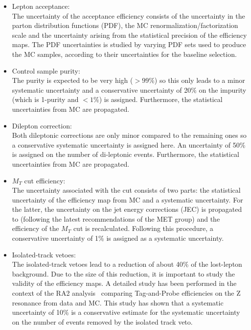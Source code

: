 \begin{itemize}
\item Lepton acceptance:\\
  The uncertainty of the acceptance efficiency consists of the uncertainty
  in the parton distribution functions (PDF), the MC renormalization/factorization scale
  and the uncertainty arising from the statistical precision of the efficiency maps.
  The PDF uncertainties is studied by varying PDF sets used to produce the
  MC samples, according to their uncertainties for the baseline selection.
\item Control sample purity:\\
The purity is expected to be very high ($>99\%$) so this only leads to a minor systematic uncertainty and a conservative uncertainty of 20\% on the impurity (which is 1-purity and $<1\%$) is assigned. Furthermore, the statistical uncertainties from MC are propagated.
\item Dilepton correction:\\
Both dileptonic corrections are only minor compared to the remaining ones so a conservative systematic uncertainty is assigned here. %
An uncertainty of 50\% is assigned on the number of di-leptonic events. Furthermore, the statistical uncertainties from MC are propagated.
\item $M_T$ cut efficiency:\\
  The uncertainty associated with the \MT cut consists of two parts: the statistical uncertainty of the efficiency map from MC and a systematic uncertainty. For the latter, the uncertainty on the jet energy corrections (JEC) is propagated to \MET (following the latest recommendations of the MET group) and the efficiency of the $M_T$ cut is recalculated. Following this procedure, a conservative uncertainty of 1\% is assigned as a systematic uncertainty. 
\item Isolated-track vetoes:\\
  The isolated-track vetoes lead to a reduction of about 40\%
  of the lost-lepton background. Due to the size of this reduction,
  it is important to study the validity of the efficiency maps. A detailed study has been performed in the context of the RA2 analysis~\cite{Sirunyan:2017cwe} comparing Tag-and-Probe efficiencies on the Z resonance from data and MC. This study has shown that a systematic uncertainty of 10\% is a conservative estimate for the systematic uncertainty on the number of events removed by the isolated track veto.

\end{itemize}
